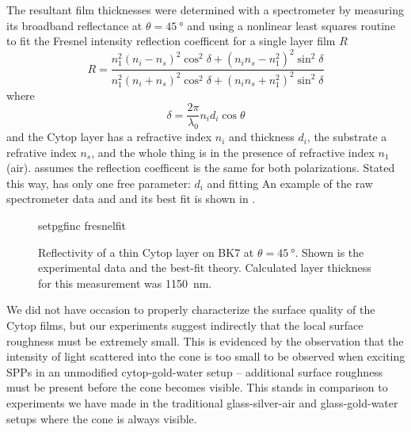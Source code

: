 The resultant film thicknesses were determined with a spectrometer by
measuring its broadband reflectance at $\theta=\SI{45}{\degree}$ and using
a nonlinear least squares routine~\cite{more1977LevAlgImpThe_2} to 
fit the Fresnel intensity reflection coefficent for a single layer
film $R$~\cite{steck2006classical} 
\begin{equation}
 R = \frac{n_1^2(n_i-n_s)^2 \cos^2\delta + (n_i n_s - n_1^2)^2\sin^2\delta}
          {n_1^2(n_i+n_s)^2 \cos^2\delta + (n_i n_s + n_1^2)^2\sin^2\delta}
          \label{eqn:fitfresnel}
\end{equation}
where
\begin{equation}
 \delta = \frac{2\pi}{\lambda_0} n_i d_i \cos \theta
\end{equation}
and the Cytop layer has a refractive index $n_i$ and thickness $d_i$, the
substrate a refrative index $n_s$, and the whole thing is in the presence
of refractive index $n_1$ (air).   assumes the
reflection coefficent is the same for both polarizations.  Stated this way,
 has only one free parameter: $d_i$ and fitting
An example of the raw spectrometer data and and its best fit is shown in
.

\begin{figure}
 \centering
 {setpgfinc}
 {fresnelfit}
 \caption{Reflectivity of a thin Cytop layer on BK7 at
 $\theta=\SI{45}{\degree}$.  Shown is the experimental data and the
 best-fit theory.  Calculated layer thickness for this measurement was
\SI{1150}{\nano\meter}.}
 \label{fig:fresnelfit}
\end{figure}

We did not have occasion to properly characterize the surface quality of
the Cytop films, but our experiments suggest indirectly that the local
surface roughness must be extremely small.  This is evidenced by the
observation that the intensity of light scattered into the cone is too
small to be observed when exciting SPPs in an unmodified cytop-gold-water
setup -- additional surface roughness must be present before the cone
becomes visible.  This stands in comparison to experiments we have made in
the traditional glass-silver-air and glass-gold-water setups where the cone
is always visible.
